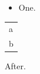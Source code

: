 \documentclass{article}
\begin{document}
\begin{itemize}
\item One.
\end{itemize}
\begin{tabular}{l}
a \\
b
\end{tabular}
After.
\end{document}
